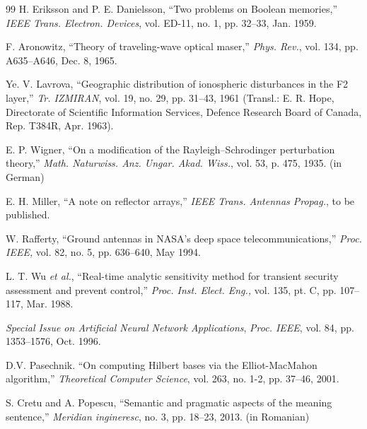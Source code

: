 \documentclass[11pt,a5paper,twoside]{article}
\begin{document}
\begin{thebibliography}{99}
 H. Eriksson and P. E. Danielsson, ``Two problems on Boolean memories,'' \textit{IEEE Trans. Electron. Devices}, vol. ED-11, no. 1, pp. 32--33, Jan. 1959. 

 F. Aronowitz, ``Theory of traveling-wave optical maser,'' \textit{Phys. Rev.}, vol. 134, pp. A635--A646, Dec. 8, 1965. 

 Ye. V. Lavrova, ``Geographic distribution of ionospheric disturbances in the F2 layer,'' \textit{Tr. IZMIRAN}, vol. 19, no. 29, pp. 31--43, 1961 (Transl.: E. R. Hope, Directorate of Scientific Information Services, Defence Research Board of Canada, Rep. T384R, Apr. 1963). 

  E. P. Wigner, ``On a modification of the Rayleigh--Schrodinger 
perturbation theory,'' \textit{Math. Naturwiss. Anz. Ungar. Akad. Wiss.}, vol. 53, p. 475, 1935. (in German)

  E. H. Miller, ``A note on reflector arrays,'' \textit{IEEE Trans. Antennas Propag.}, to be published. 

  W. Rafferty, ``Ground antennas in NASA's deep space 
telecommunications,'' \textit{Proc. IEEE,} vol. 82, no. 5, pp. 636--640, May 1994. 

  L. T. Wu \textit{et al.}, ``Real-time analytic sensitivity method for transient security assessment and prevent control,'' \textit{Proc. Inst. Elect. Eng., }vol. 135, pt. C, pp. 107--117, Mar. 1988. 

  \textit{Special Issue on Artificial Neural Network Applications}, \textit{Proc. IEEE}, vol. 84, pp. 1353--1576, Oct. 1996. 


D.V. Pasechnik. ``On computing Hilbert bases via the Elliot-MacMahon algorithm,'' \textit{Theoretical Computer Science}, vol. 263, no. 1-2, pp.
37--46, 2001. 


  S. Cretu and A. Popescu, ``Semantic and pragmatic aspects of the meaning sentence,'' \textit{Meridian ingineresc}, no. 3, pp. 18--23, 2013. (in Romanian)


\end{thebibliography}
\end{document}
